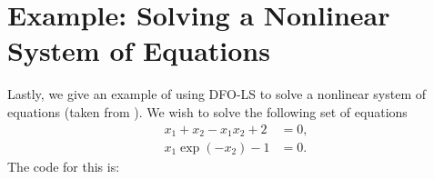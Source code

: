 \documentclass[letterpaper,10pt,english]{sphinxmanual}
\begin{document}
\section{Example: Solving a Nonlinear System of Equations}
\label{\detokenize{userguide:example-solving-a-nonlinear-system-of-equations}}
Lastly, we give an example of using DFO-LS to solve a nonlinear system of equations (taken from ). We wish to solve the following set of equations
\begin{equation*}
\begin{split}x_1 + x_2 - x_1 x_2 + 2 &= 0, \\
x_1 \exp(-x_2) - 1 &= 0.\end{split}
\end{equation*}
The code for this is:
\end{document}
